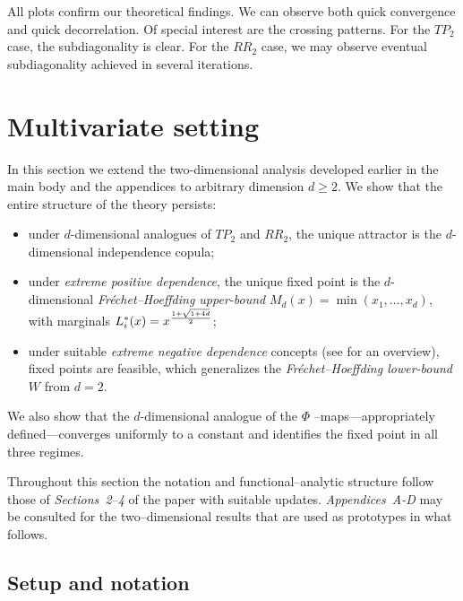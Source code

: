 \documentclass[onecolumn]{article}
\begin{document}
All plots confirm our theoretical findings. We can observe both quick
convergence and quick decorrelation. Of special interest are the crossing
patterns. For the $TP_{2}$ case, the subdiagonality is clear. For the $%
RR_{2} $ case, we may observe eventual subdiagonality achieved in several
iterations.

\section{Multivariate setting}

In this section we extend the two-dimensional analysis developed earlier in
the main body and the appendices to arbitrary dimension $d\geq 2$. We show
that the entire structure of the theory persists:

\begin{itemize}
\item under $d$-dimensional analogues of $TP_{2}$ and $RR_{2}$, the unique
attractor is the $d$-dimensional independence copula;

\item under \textit{extreme positive dependence}, the unique fixed point is
the $d$-dimensional \textit{Fr\'{e}chet--Hoeffding upper-bound} $%
M_{d}(x)=\min (x_{1},\dots ,x_{d})$, with marginals $L_{i}^{\ast }(x)=x^{%
\frac{1+\sqrt{1+4d}}{2}}$;

\item under suitable \textit{extreme negative dependence} concepts (see \cite%
{[48]} for an overview), fixed points are feasible, which generalizes the 
\textit{Fr\'{e}chet--Hoeffding lower-bound} $W$ from $d=2$.
\end{itemize}

We also show that the $d$-dimensional analogue of the $\Phi$%
--maps---appropriately defined---converges uniformly to a constant and
identifies the fixed point in all three regimes.

Throughout this section the notation and functional--analytic structure
follow those of \textit{Sections~2--4} of the paper with suitable updates. 
\textit{Appendices~A-D} may be consulted for the two--dimensional results
that are used as prototypes in what follows.

\subsection{Setup and notation}
\end{document}
